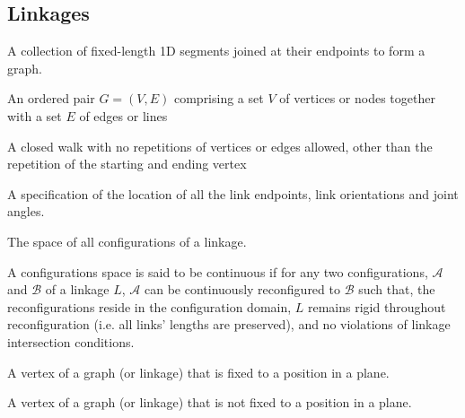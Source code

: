 \subsection{Linkages}
\begin{definition}[Linkage]\label{def:linkages-1}
A collection of fixed-length 1D segments joined at their endpoints to form a graph.
\end{definition} 
\begin{definition}[Graph]\label{def:linkages-2}
An ordered pair $G = (V, E)$ comprising a set $V$ of vertices or nodes together with a set $E$ of edges or lines
\end{definition} 
\begin{definition}[Cycle]\label{def:linkages-3}
 A closed walk with no repetitions of vertices or edges allowed, other than the repetition of the starting and ending vertex
\end{definition} 
\begin{definition}[Configuration]\label{def:linkages-6}
A specification of the location of all the link endpoints, link orientations and
joint angles.\cite{demaine2008geometric}
\end{definition}
\begin{definition}\label{def:linkages-7}
The space of all configurations of a linkage.
\end{definition} 
A configurations space is said to be continuous if for any two configurations, $\mathcal{A}$ and $\mathcal{B}$ of a linkage $L$, $\mathcal{A}$ can be continuously reconfigured to $\mathcal{B}$ such that, the reconfigurations reside in the configuration domain, $L$ remains rigid throughout reconfiguration (i.e. all links' lengths are preserved), and no violations of linkage intersection conditions. 
\begin{definition}\label{def:linkages-8}
A vertex of a graph (or linkage) that is fixed to a position in a plane.
\end{definition} 
\begin{definition}\label{def:linkages-8}
A vertex of a graph (or linkage) that is not fixed to a position in a plane.
\end{definition} 
